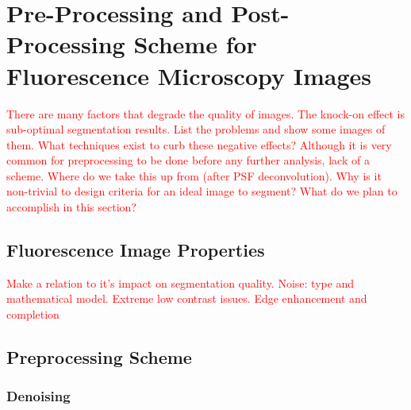 
\chapter{Pre-Processing and Post-Processing Scheme for Fluorescence Microscopy Images} %

\label{chap:Chapter7} %

\textcolor{red}{There are many factors that degrade the quality of images. The knock-on effect is sub-optimal segmentation results. List the problems and show some images of them. What techniques exist to curb these negative effects? Although it is very common for preprocessing to be done before any further analysis, lack of a scheme. Where do we take this up from (after PSF deconvolution). Why is it non-trivial to design criteria for an ideal image to segment? What do we plan to accomplish in this section?}


\section{Fluorescence Image Properties}
\label{sec:imageproperties}

\textcolor{red}{Make a relation to it's impact on segmentation quality. 
	Noise: type and mathematical model. 
	Extreme low contrast issues.
	Edge enhancement and completion}


\section{Preprocessing Scheme}
\label{sec:preprocessscheme}



\subsection{Denoising}
\label{sec:PoissonDenoising}

